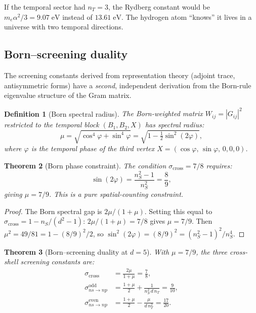 \documentclass[12pt]{article}
\newtheorem{theorem}{Theorem}[section]
\newtheorem{definition}[theorem]{Definition}
\theoremstyle{remark}
\theoremstyle{definition}
\begin{document}
If the temporal sector had $n_T = 3$, the Rydberg constant would be $m_e\alpha^2/3 = 9.07\;\text{eV}$ instead of $13.61\;\text{eV}$.  The hydrogen atom ``knows'' it lives in a universe with two temporal directions.

\subsection{Born--screening duality}
\label{sec:born_screening}

The screening constants derived from representation theory (adjoint trace, antisymmetric forms) have a \emph{second}, independent derivation from the Born-rule eigenvalue structure of the Gram matrix.

\begin{definition}[Born spectral radius]
The Born-weighted matrix $W_{ij} = |G_{ij}|^2$ restricted to the temporal block $(B_1, B_2, X)$ has spectral radius:
\begin{equation}
\mu = \sqrt{\cos^4\varphi + \sin^4\varphi} = \sqrt{1 - \tfrac{1}{2}\sin^2(2\varphi)},
\end{equation}
where $\varphi$ is the temporal phase of the third vertex $X = (\cos\varphi,\,\sin\varphi,\,0,0,0)$.
\end{definition}

\begin{theorem}[Born phase constraint]
\label{thm:born_phase}
The condition $\sigma_\text{cross} = 7/8$ requires:
\begin{equation}
\boxed{\sin(2\varphi) = \frac{n_S^2-1}{n_S^2} = \frac{8}{9},}
\end{equation}
giving $\mu = 7/9$.  This is a pure spatial-counting constraint.
\end{theorem}
\begin{proof}
The Born spectral gap is $2\mu/(1\!+\!\mu)$.  Setting this equal to $\sigma_\text{cross} = 1 - n_S/(d^2\!-\!1)$: $2\mu/(1\!+\!\mu) = 7/8$ gives $\mu = 7/9$.  Then $\mu^2 = 49/81 = 1 - (8/9)^2/2$, so $\sin^2(2\varphi) = (8/9)^2 = (n_S^2\!-\!1)^2/n_S^4$.
\end{proof}

\begin{theorem}[Born--screening duality at $d=5$]
\label{thm:born_screening}
With $\mu = 7/9$, the three cross-shell screening constants are:
\begin{align}
\sigma_\text{cross} &= \frac{2\mu}{1+\mu} = \frac{7}{8}, \label{eq:born_cross}\\[3pt]
\sigma_{ns\to np}^\text{odd} &= \frac{1+\mu}{2} + \frac{1}{n_S^2\,d\,n_T} = \frac{9}{10}, \label{eq:born_odd}\\[3pt]
\sigma_{ns\to np}^\text{even} &= \frac{1+\mu}{2} - \frac{\mu}{d\,n_T^2} = \frac{17}{20}. \label{eq:born_even}
\end{align}
\end{theorem}
\end{document}
